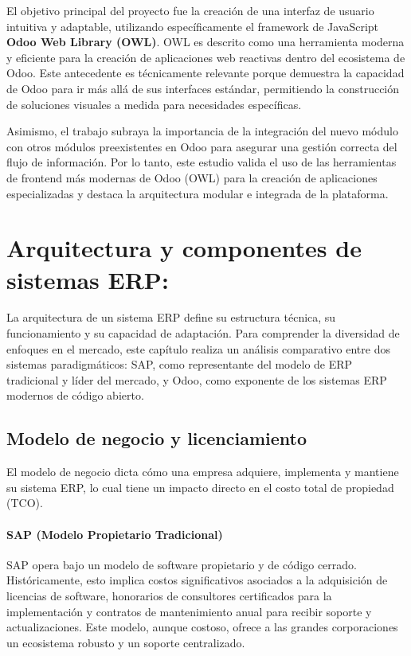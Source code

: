 \documentclass[12pt,letterpaper,spanish]{report}
\begin{document}
El objetivo principal del proyecto fue la creación de una interfaz de usuario intuitiva y adaptable, utilizando específicamente el framework de JavaScript \textbf{Odoo Web Library (OWL)}. OWL es descrito como una herramienta moderna y eficiente para la creación de aplicaciones web reactivas dentro del ecosistema de Odoo. Este antecedente es técnicamente relevante porque demuestra la capacidad de Odoo para ir más allá de sus interfaces estándar, permitiendo la construcción de soluciones visuales a medida para necesidades específicas.

Asimismo, el trabajo subraya la importancia de la integración del nuevo módulo con otros módulos preexistentes en Odoo para asegurar una gestión correcta del flujo de información. Por lo tanto, este estudio valida el uso de las herramientas de frontend más modernas de Odoo (OWL) para la creación de aplicaciones especializadas y destaca la arquitectura modular e integrada de la plataforma.




\section{Arquitectura y componentes de sistemas ERP:}

La arquitectura de un sistema ERP define su estructura técnica, su funcionamiento y su capacidad de adaptación. Para comprender la diversidad de enfoques en el mercado, este capítulo realiza un análisis comparativo entre dos sistemas paradigmáticos: SAP, como representante del modelo de ERP tradicional y líder del mercado, y Odoo, como exponente de los sistemas ERP modernos de código abierto.

\subsection{Modelo de negocio y licenciamiento}


El modelo de negocio dicta cómo una empresa adquiere, implementa y mantiene su sistema ERP, lo cual tiene un impacto directo en el costo total de propiedad (TCO).

\paragraph{SAP (Modelo Propietario Tradicional)}
SAP opera bajo un modelo de software propietario y de código cerrado. Históricamente, esto implica costos significativos asociados a la adquisición de licencias de software, honorarios de consultores certificados para la implementación y contratos de mantenimiento anual para recibir soporte y actualizaciones. Este modelo, aunque costoso, ofrece a las grandes corporaciones un ecosistema robusto y un soporte centralizado.
\end{document}
